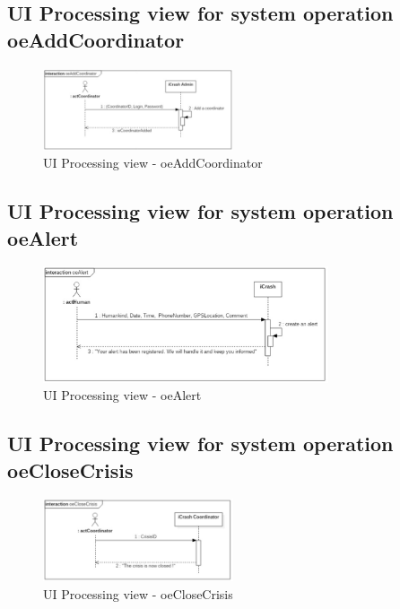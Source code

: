 


\subsection{UI Processing view for system operation oeAddCoordinator}
\begin{figure}[h]
	\centering	
	\captionsetup{justification=centering}
	\includegraphics[width=0.5\textwidth]{./images/ui_oeAddCoordinator.eps}
	\caption{UI Processing view - oeAddCoordinator}
\end{figure}
 
\subsection{UI Processing view for system operation oeAlert}

\begin{figure}[h]
	\centering	
	\captionsetup{justification=centering}
	\includegraphics[width=0.75\textwidth]{./images/ui_oeAlert.eps}
	\caption{UI Processing view - oeAlert}
\end{figure}


\subsection{UI Processing view for system operation oeCloseCrisis}

\begin{figure}[h]
	\centering	
	\captionsetup{justification=centering}
	\includegraphics[width=0.5\textwidth]{./images/ui_oeCloseCrisis.eps}
	\caption{UI Processing view - oeCloseCrisis}
\end{figure}


